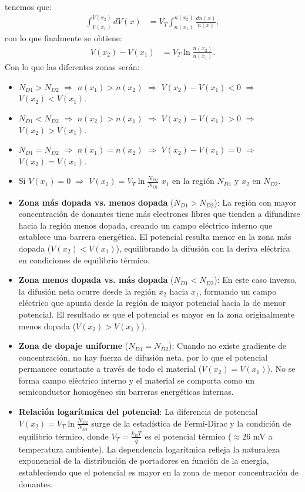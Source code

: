 tenemos que:
\begin{align}
    \int_{V(x_1)}^{V(x_2)} dV(x) &= V_T \int_{n(x_1)}^{n(x_2)} \frac{dn(x)}{n(x)},
\end{align}
con lo que finalmente se obtiene:
\begin{align}
    V(x_2)-V(x_1) &= V_T \ln\!\frac{n(x_2)}{n(x_1)}.
\end{align}
Con lo que las diferentes zonas serán:
\begin{itemize}
    \item \(N_{D1}>N_{D2}\) \(\Rightarrow\) \(n(x_1)>n(x_2)\) \(\Rightarrow\) \(V(x_2)-V(x_1)<0\) \(\Rightarrow\) \(V(x_2)<V(x_1)\).
    \item \(N_{D1}<N_{D2}\) \(\Rightarrow\) \(n(x_2)>n(x_1)\) \(\Rightarrow\) \(V(x_2)-V(x_1)>0\) \(\Rightarrow\) \(V(x_2)>V(x_1)\).
    \item \(N_{D1}=N_{D2}\) \(\Rightarrow\) \(n(x_1)=n(x_2)\) \(\Rightarrow\) \(V(x_2)-V(x_1)=0\) \(\Rightarrow\) \(V(x_2)=V(x_1)\).
    \item Si \(V(x_1)=0\) \(\Rightarrow\) \(\displaystyle V(x_2)=V_T \ln\!\frac{N_{D2}}{N_{D1}}\)  \(x_1\) en la región \(N_{D1}\) y \(x_2\) en \(N_{D2}\)\text{)}.
\end{itemize}
\begin{itemize}
    \item  \textbf{Zona más dopada vs. menos dopada} (\(N_{D1}>N_{D2}\)): La región con mayor concentración de donantes tiene más electrones libres que tienden a difundirse hacia la región menos dopada, creando un campo eléctrico interno que establece una barrera energética. El potencial resulta menor en la zona más dopada (\(V(x_2)<V(x_1)\)), equilibrando la difusión con la deriva eléctrica en condiciones de equilibrio térmico.
\item  \textbf{Zona menos dopada vs. más dopada} (\(N_{D1}<N_{D2}\)): En este caso inverso, la difusión neta ocurre desde la región \(x_2\) hacia \(x_1\), formando un campo eléctrico que apunta desde la región de mayor potencial hacia la de menor potencial. El resultado es que el potencial es mayor en la zona originalmente menos dopada (\(V(x_2)>V(x_1)\)).
\item \textbf{Zona de dopaje uniforme} (\(N_{D1}=N_{D2}\)): Cuando no existe gradiente de concentración, no hay fuerza de difusión neta, por lo que el potencial permanece constante a través de todo el material (\(V(x_2)=V(x_1)\)). No se forma campo eléctrico interno y el material se comporta como un semiconductor homogéneo sin barreras energéticas internas.
\item \textbf{Relación logarítmica del potencial}: La diferencia de potencial \(V(x_2)=V_T \ln\!\frac{N_{D2}}{N_{D1}}\) surge de la estadística de Fermi-Dirac y la condición de equilibrio térmico, donde \(V_T = \frac{k_B T}{q}\) es el potencial térmico (\(\approx 26\) mV a temperatura ambiente). La dependencia logarítmica refleja la naturaleza exponencial de la distribución de portadores en función de la energía, estableciendo que el potencial es mayor en la zona de menor concentración de donantes.
\end{itemize}

